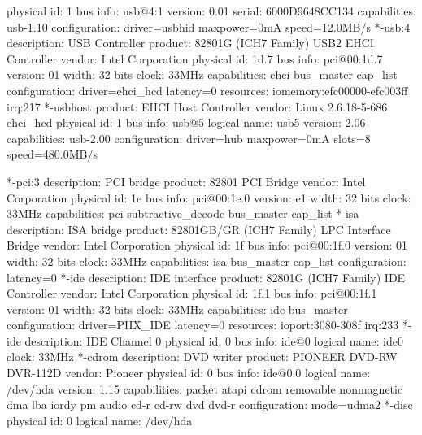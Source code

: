 \documentclass[mingoth,a4paper]{jsarticle}
\begin{document}
\begin{commandline}
                   physical id: 1
                   bus info: usb@4:1
                   version: 0.01
                   serial: 6000D9648CC134
                   capabilities: usb-1.10
                   configuration: driver=usbhid maxpower=0mA speed=12.0MB/s
        *-usb:4
             description: USB Controller
             product: 82801G (ICH7 Family) USB2 EHCI Controller
             vendor: Intel Corporation
             physical id: 1d.7
             bus info: pci@00:1d.7
             version: 01
             width: 32 bits
             clock: 33MHz
             capabilities: ehci bus_master cap_list
             configuration: driver=ehci_hcd latency=0
             resources: iomemory:efc00000-efc003ff irq:217
           *-usbhost
                product: EHCI Host Controller
                vendor: Linux 2.6.18-5-686 ehci_hcd
                physical id: 1
                bus info: usb@5
                logical name: usb5
                version: 2.06
                capabilities: usb-2.00
                configuration: driver=hub maxpower=0mA slots=8 speed=480.0MB/s
\end{commandline}
\begin{commandline}
        *-pci:3
             description: PCI bridge
             product: 82801 PCI Bridge
             vendor: Intel Corporation
             physical id: 1e
             bus info: pci@00:1e.0
             version: e1
             width: 32 bits
             clock: 33MHz
             capabilities: pci subtractive_decode bus_master cap_list
        *-isa
             description: ISA bridge
             product: 82801GB/GR (ICH7 Family) LPC Interface Bridge
             vendor: Intel Corporation
             physical id: 1f
             bus info: pci@00:1f.0
             version: 01
             width: 32 bits
             clock: 33MHz
             capabilities: isa bus_master cap_list
             configuration: latency=0
        *-ide
             description: IDE interface
             product: 82801G (ICH7 Family) IDE Controller
             vendor: Intel Corporation
             physical id: 1f.1
             bus info: pci@00:1f.1
             version: 01
             width: 32 bits
             clock: 33MHz
             capabilities: ide bus_master
             configuration: driver=PIIX_IDE latency=0
             resources: ioport:3080-308f irq:233
           *-ide
                description: IDE Channel 0
                physical id: 0
                bus info: ide@0
                logical name: ide0
                clock: 33MHz
              *-cdrom
                   description: DVD writer
                   product: PIONEER DVD-RW DVR-112D
                   vendor: Pioneer
                   physical id: 0
                   bus info: ide@0.0
                   logical name: /dev/hda
                   version: 1.15
                   capabilities: packet atapi cdrom removable nonmagnetic dma lba iordy pm audio cd-r cd-rw dvd dvd-r
                   configuration: mode=udma2
                 *-disc
                      physical id: 0
                      logical name: /dev/hda
\end{commandline}
\end{document}
